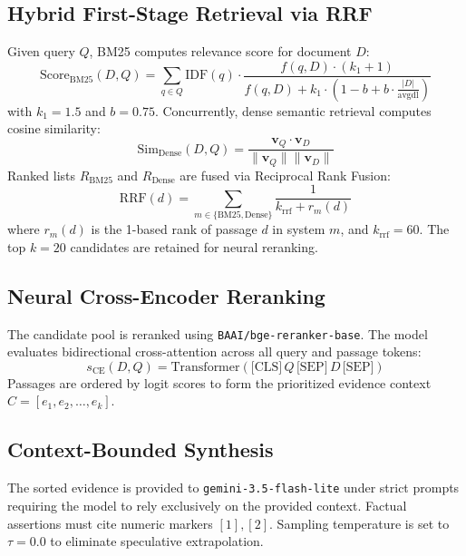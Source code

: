 \documentclass[conference]{IEEEtran}
\begin{document}
\subsection{Hybrid First-Stage Retrieval via RRF}
Given query $Q$, BM25 computes relevance score for document $D$:
\begin{equation}
\text{Score}_{\text{BM25}}(D, Q) = \sum_{q \in Q} \text{IDF}(q) \cdot \frac{f(q, D) \cdot (k_1 + 1)}{f(q, D) + k_1 \cdot \left(1 - b + b \cdot \frac{|D|}{\text{avgdl}}\right)}
\end{equation}
with $k_1 = 1.5$ and $b = 0.75$. Concurrently, dense semantic retrieval computes cosine similarity:
\begin{equation}
\text{Sim}_{\text{Dense}}(D, Q) = \frac{\mathbf{v}_Q \cdot \mathbf{v}_D}{\|\mathbf{v}_Q\| \|\mathbf{v}_D\|}
\end{equation}
Ranked lists $R_{\text{BM25}}$ and $R_{\text{Dense}}$ are fused via Reciprocal Rank Fusion:
\begin{equation}
\text{RRF}(d) = \sum_{m \in \{\text{BM25}, \text{Dense}\}} \frac{1}{k_{\text{rrf}} + r_m(d)}
\end{equation}
where $r_m(d)$ is the 1-based rank of passage $d$ in system $m$, and $k_{\text{rrf}} = 60$. The top $k=20$ candidates are retained for neural reranking.

\subsection{Neural Cross-Encoder Reranking}
The candidate pool is reranked using \texttt{BAAI/bge-reranker-base}. The model evaluates bidirectional cross-attention across all query and passage tokens:
\begin{equation}
s_{\text{CE}}(D, Q) = \text{Transformer}(\text{[CLS]} \, Q \, \text{[SEP]} \, D \, \text{[SEP]})
\end{equation}
Passages are ordered by logit scores to form the prioritized evidence context $C = [e_1, e_2, \dots, e_k]$.

\subsection{Context-Bounded Synthesis}
The sorted evidence is provided to \texttt{gemini-3.5-flash-lite} under strict prompts requiring the model to rely exclusively on the provided context. Factual assertions must cite numeric markers $[1], [2]$. Sampling temperature is set to $\tau = 0.0$ to eliminate speculative extrapolation.
\end{document}
